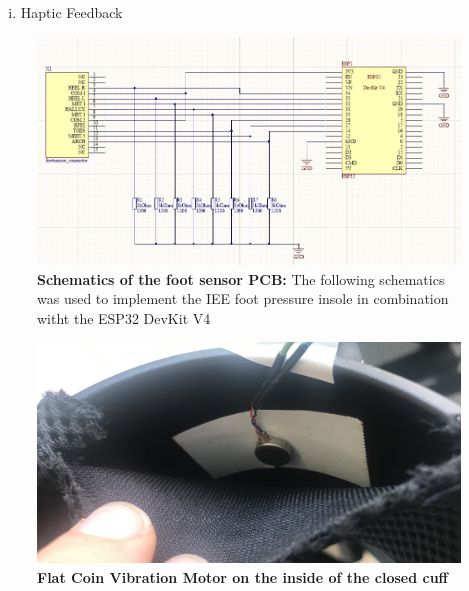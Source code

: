 \cleardoublepage
\begin{enumerate}[iii.]
\item{Haptic Feedback} 
\end{enumerate}



\label{subsec:HF requirements}


\label{subsec:HF Vibration}



\begin{figure}
    \centering
    \includegraphics[width=1\columnwidth]{Appendix/haptic_feedback/Schematics.jpg}
    \caption{\textbf{Schematics of the foot sensor PCB:} The following schematics was used to implement the IEE foot pressure insole in combination witht the ESP32 DevKit V4}
    \label{fig:schematics}
\end{figure}


\begin{figure}[!t]
	\centering
	\includegraphics[width=1\columnwidth]{Appendix/haptic_feedback/Vibration.jpg}
	\caption{\textbf{Flat Coin Vibration Motor on the inside of the closed cuff}}
	\label{fig: vibration}
\end{figure}


